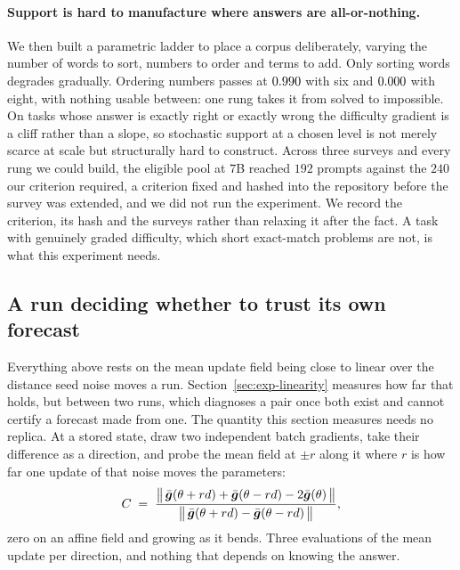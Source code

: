 \paragraph{Support is hard to manufacture where answers are all-or-nothing.} We then built a
parametric ladder to place a corpus deliberately, varying the number of words to sort, numbers to
order and terms to add. Only sorting words degrades gradually. Ordering numbers passes at
$0.990$ with six and $0.000$ with eight, with nothing usable between: one
rung takes it from solved to impossible. On tasks whose answer is exactly right or exactly wrong
the difficulty gradient is a cliff rather than a slope, so stochastic support at a chosen level is
not merely scarce at scale but structurally hard to construct. Across three surveys and every
rung we could build, the eligible pool at $7$B reached $192$ prompts against the $240$ our
criterion required, a criterion fixed and hashed into the repository before the survey was
extended, and we did not run the experiment. We record the criterion, its
hash and the surveys rather than relaxing it after the fact. A task with genuinely graded
difficulty, which short exact-match problems are not, is what this experiment needs.

\subsection{A run deciding whether to trust its own forecast}
\label{sec:exp-abstain}

Everything above rests on the mean update field being close to linear over the distance seed noise
moves a run. Section~\ref{sec:exp-linearity} measures how far that holds, but between two runs,
which diagnoses a pair once both exist and cannot certify a forecast made from one. The quantity
this section measures needs no replica. At a stored state, draw two independent batch gradients,
take their difference as a direction, and probe the mean field at $\pm r$ along it where
$r$ is how far one update of that noise moves the parameters:
\begin{equation}
  \label{eq:curvature}
  C \;=\;
  \frac{\big\|\,\bar{\bm{g}}(\theta + r d) + \bar{\bm{g}}(\theta - r d) - 2\bar{\bm{g}}(\theta)\,\big\|}
       {\big\|\,\bar{\bm{g}}(\theta + r d) - \bar{\bm{g}}(\theta - r d)\,\big\|},
\end{equation}
zero on an affine field and growing as it bends. Three evaluations of the mean update per
direction, and nothing that depends on knowing the answer.

